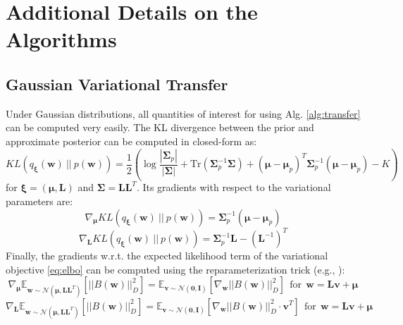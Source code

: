 \documentclass{article}
\begin{document}
\section{Additional Details on the Algorithms}

\subsection{Gaussian Variational Transfer}

Under Gaussian distributions, all quantities of interest for using Alg. \ref{alg:transfer} can be computed very easily. The KL divergence between the prior and approximate posterior can be computed in closed-form as:
\begin{equation}
KL\left(q_{\bm{\xi}}(\bm{w})\ ||\ p(\bm{w})\right) = \frac{1}{2}\left( \log\frac{\left\lvert \bm{\Sigma}_p \right\rvert}{\left\lvert \bm{\Sigma} \right\rvert} + \text{Tr}\left( \bm{\Sigma}_p^{-1}\bm{\Sigma} \right) + (\bm{\mu} - \bm{\mu}_p)^T \bm{\Sigma}_p^{-1} (\bm{\mu} - \bm{\mu}_p) -K \right)
\end{equation}
for $\bm{\xi} = (\bm{\mu},\bm{L})$ and $\bm{\Sigma} = \bm{LL}^T$. Its gradients with respect to the variational parameters are:
\begin{equation}\label{eq:klgradmu}
\nabla_{\bm{\mu}} KL\left(q_{\bm{\xi}}(\bm{w})\ ||\ p(\bm{w})\right) = \bm{\Sigma}_p^{-1} (\bm{\mu} - \bm{\mu}_p)
\end{equation}
\begin{equation}\label{eq:klgradL}
\nabla_{\bm{L}} KL\left(q_{\bm{\xi}}(\bm{w})\ ||\ p(\bm{w})\right) = \bm{\Sigma}_p^{-1}\bm{L} - (\bm{L}^{-1})^T 
\end{equation}
Finally, the gradients w.r.t. the expected likelihood term of the variational objective \eqref{eq:elbo} can be computed using the reparameterization trick (e.g., \cite{hoffman2013stochastic,rezende2014stochastic}):
\begin{equation}\label{eq:tdgradmu}
\nabla_{\bm{\mu}} \mathbb{E}_{\bm{w} \sim \mathcal{N}(\bm{\mu},\bm{LL}^T)}\left[ ||B(\bm{w})||_{D}^2 \right] = \mathbb{E}_{\bm{v} \sim \mathcal{N}(\bm{0},\bm{I})}\left[ \nabla_{\bm{w}} ||B(\bm{w})||_{D}^2 \right]\ \ \text{for}\ \ \bm{w} = \bm{Lv} + \bm{\mu}
\end{equation} 
\begin{equation}\label{eq:tdgradL}
\nabla_{\bm{L}} \mathbb{E}_{\bm{w} \sim \mathcal{N}(\bm{\mu},\bm{LL}^T)}\left[ ||B(\bm{w})||_{D}^2 \right] = \mathbb{E}_{\bm{v} \sim \mathcal{N}(\bm{0},\bm{I})}\left[ \nabla_{\bm{w}} ||B(\bm{w})||_{D}^2 \cdot \bm{v}^T \right]\ \ \text{for}\ \ \bm{w} = \bm{Lv} + \bm{\mu}
\end{equation}
\end{document}
